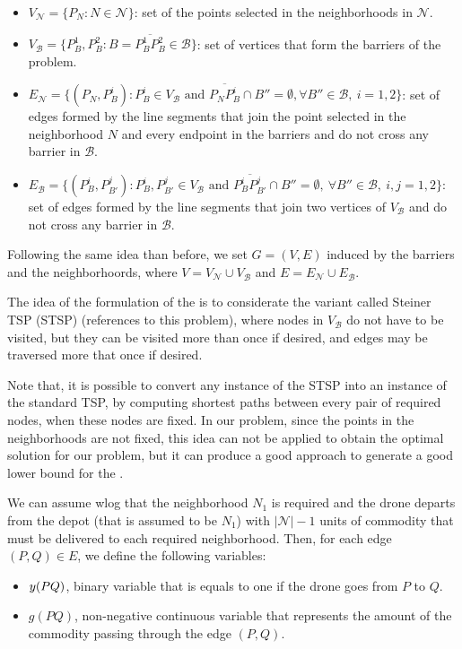 \documentclass[a4paper]{elsarticle}
\newcommand{\TSP}{{\sf{TSPN-P} \xspace}}
\newcommand{\B}{{\mathcal B}}
\newcommand{\VB}{{V^{}_{\mathcal B}}}
\newcommand{\EB}{{E^{}_{\mathcal B}}}
\newcommand{\VN}{{V^{}_{\mathcal N}}}
\newcommand{\EN}{{E^{}_{\mathcal N}}}
\begin{document}
\begin{itemize}
\item $\VN=\{P_N:N\in\mathcal N\}$: set of the points selected in the neighborhoods in $\mathcal N$.
\item $\VB=\{P^1_B, P^2_B:B=\overline{P^1_B P^2_B}\in \mathcal B\}$: set of vertices that form the barriers of the problem.
\item $\EN=\{(P_N, P^i_{B}):P^i_B\in V_\B\text{ and } \overline{P_NP^i_B}\cap B''=\emptyset,\forall B''\in\B,\:i=1,2\}$: set of edges formed by the line segments that join the point selected in the neighborhood $N$ and every endpoint in the barriers and do not cross any barrier in $\B$.
\item $\EB=\{(P^{i}_B, P^{j}_{B'}):P^i_B, P^j_{B'}\in \VB \text{ and } \overline{P^i_B P^j_{B'}}\cap B''=\emptyset,\:\forall B''\in\mathcal B,\:i, j=1,2\}$: set of edges formed by the line segments that join two vertices of $V_{\mathcal B}$ and do not cross any barrier in $\B$.
\end{itemize} 

Following the same idea than before, we set $G=(V,E)$ induced by the barriers and the neighborhoords, where $V=\VN\cup\VB$ and $E=\EN\cup\EB$. 

The idea of the formulation of the \TSP is to considerate the variant called Steiner TSP (STSP) (references to this problem), where nodes in $\VB$ do not have to be visited, but they can be visited more than once if desired, and edges may be traversed more that once if desired. 

Note that, it is possible to convert any instance of the STSP into an instance of the standard TSP, by computing shortest paths between every pair of required nodes, when these nodes are fixed. In our problem, since the points in the neighborhoods are not fixed, this idea can not be applied to obtain the optimal solution for our problem, but it can produce a good approach to generate a good lower bound for the \TSP.


\newcommand{\gvar}[2]{g(#1#2)}

We can assume wlog that the neighborhood $N_1$ is required and the drone departs from the depot (that is assumed to be $N_1$) with $|\mathcal N|-1$ units of commodity that must be delivered to each required neighborhood. Then, for each edge $(P, Q)\in E$, we define the following variables:
\begin{itemize}
	\item $y(PQ)$, binary variable that is equals to one if the drone goes from $P$ to $Q$.
	\item $\gvar{P}{Q}$, non-negative continuous variable that represents the amount of the commodity passing through the edge $(P, Q)$.
\end{itemize}
\end{document}
